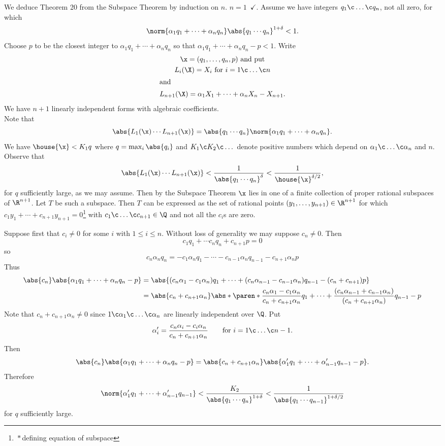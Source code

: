 We deduce Theorem 20 from the Subspace Theorem by induction on $n$.  $n=1$~$\checkmark$.  Assume we have integers $q_1\c \dotsc\c q_n$, not all zero, for which
\[ \norm{\alpha_1q_1+\dotsb+\alpha_nq_n}\abs{q_1\dotsm q_n}^{1+\delta} < 1 . \]
Choose $p$ to be the closest integer to $\alpha_1q_1+\dotsb+\alpha_nq_n$ so that $\alpha_1q_1+\dotsb+\alpha_nq_n-p<1$.  Write
\begin{gather*}
\x = (q_1,\dotsc,q_n,p) \text{ and put} \\
L_i(\X) = X_i \text{ for $i=1\c \dotsc\c n$} \\
\shortintertext{and}
L_{n+1}(\X) = \alpha_1X_1+\dotsb+\alpha_nX_n-X_{n+1} .
\end{gather*}
We have $n+1$ linearly independent forms with algebraic coefficients. \\
Note that
\[ \abs{L_1(\x)\dotsm L_{n+1}(\x)} = \abs{q_1\dotsm q_n}\norm{\alpha_1q_1+\dotsb+\alpha_nq_n} . \]
We have $\house{\x}<K_1q$ where $q=\max_i\abs{q_i}$ and $K_1\c K_2\c \dotsc$ denote positive numbers which depend on $\alpha_1\c \dotsc\c \alpha_n$ and $n$. %
Observe that
\[ \abs{L_1(\x)\dotsm L_{n+1}(\x)} < \frac{1}{\abs{q_1\dotsm q_n}^\delta} < \frac{1}{\house{\x}^{\delta/2}} , \]
for $q$ sufficiently large, as we may assume.  Then by the Subspace Theorem $\x$ lies in one of a finite collection of proper rational subspaces of $\R^{n+1}$.  Let $T$ be such a subspace.  Then $T$ can be expressed as the set of rational points $(y_1,\dotsc,y_{n+1})\in\R^{n+1}$ for which $c_1y_1+\dotsb+c_{n+1}y_{n+1}=0$\footnote{\,$*$\;\,defining equation of subspace} with $c_1\c \dotsc\c c_{n+1}\in\Q$ and not all the $c_i$s are zero.

Suppose first that $c_i\neq0$ for some $i$ with $1\leq i\leq n$.  Without loss of generality we may suppose $c_n\neq0$.  Then
\[ c_1q_1+\dotsb c_nq_n + c_{n+1}p = 0 \]
so
\[ c_n\alpha_nq_n = -c_1\alpha_nq_1 - \dotsb -c_{n-1}\alpha_nq_{n-1} - c_{n+1}\alpha_np \]
Thus
\begin{align*}
\abs{c_n}\abs{\alpha_1q_1+\dotsb+\alpha_nq_n-p}
&= \abs{(c_n\alpha_1-c_1\alpha_n)q_1+\dotsb+(c_n\alpha_{n-1}-c_{n-1}\alpha_n)q_{n-1}-(c_n+c_{n+1})p} \\
&= \abs{c_n+c_{n+1}\alpha_n}\abs*{\paren*{\frac{c_n\alpha_1-c_1\alpha_n}{c_n+c_{n+1}\alpha_n}}q_1+\dotsb+\frac{(c_n\alpha_{n-1}+c_{n-1}\alpha_n)}{(c_n+c_{n+1}\alpha_n)}q_{n-1}-p}
\end{align*}
Note that $c_n+c_{n+1}\alpha_n\neq0$ since $1\c \alpha_1\c \dotsc\c \alpha_n$ are linearly independent over $\Q$.  Put
\[ \alpha'_i = \frac{c_n\alpha_i-c_i\alpha_n}{c_n+c_{n+1}\alpha_n} \qquad\text{for $i=1\c \dotsc\c n-1$} . \]
Then
\[ \abs{c_n}\abs{\alpha_1q_1+\dotsb+\alpha_nq_n-p} = \abs{c_n+c_{n+1}\alpha_n}\abs{\alpha'_1q_1+\dotsb+\alpha'_{n-1}q_{n-1}-p} . \]
Therefore
\[ \norm{\alpha'_1q_1+\dotsb+\alpha'_{n-1}q_{n-1}} < \frac{K_2}{\abs{q_1\dotsm q_n}^{1+\delta}} < \frac{1}{\abs{q_1\dotsm q_{n-1}}^{1+\delta/2}} \]
for $q$ sufficiently large.

